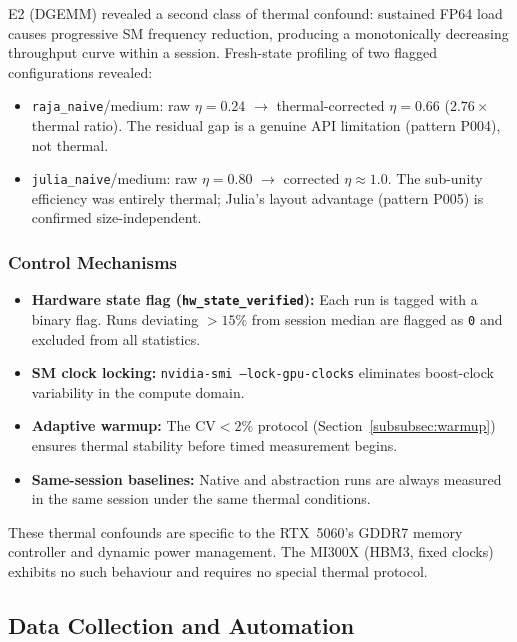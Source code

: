 E2 (DGEMM) revealed a second class of thermal confound: sustained FP64 load
causes progressive SM frequency reduction, producing a monotonically decreasing
throughput curve within a session. Fresh-state profiling of two flagged
configurations revealed:

\begin{itemize}
    \item \texttt{raja\_naive}/medium: raw $\eta = 0.24$ $\rightarrow$
    thermal-corrected $\eta = 0.66$ ($2.76\times$ thermal ratio). The residual
    gap is a genuine API limitation (pattern P004), not thermal.
    \item \texttt{julia\_naive}/medium: raw $\eta = 0.80$ $\rightarrow$
    corrected $\eta \approx 1.0$. The sub-unity efficiency was entirely
    thermal; Julia's layout advantage (pattern P005) is confirmed
    size-independent.
\end{itemize}

\subsubsection{Control Mechanisms}

\begin{itemize}
    \item \textbf{Hardware state flag (\texttt{hw\_state\_verified}):} Each run
    is tagged with a binary flag. Runs deviating $> 15\%$ from session median
    are flagged as \texttt{0} and excluded from all statistics.
    \item \textbf{SM clock locking:} \texttt{nvidia-smi --lock-gpu-clocks}
    eliminates boost-clock variability in the compute domain.
    \item \textbf{Adaptive warmup:} The CV$< 2\%$ protocol
    (Section~\ref{subsubsec:warmup}) ensures thermal stability before timed
    measurement begins.
    \item \textbf{Same-session baselines:} Native and abstraction runs are
    always measured in the same session under the same thermal conditions.
\end{itemize}

\noindent These thermal confounds are specific to the RTX~5060's GDDR7
memory controller and dynamic power management. The MI300X (HBM3, fixed clocks)
exhibits no such behaviour and requires no special thermal protocol.

\subsection{Data Collection and Automation}
\label{subsec:automation}

